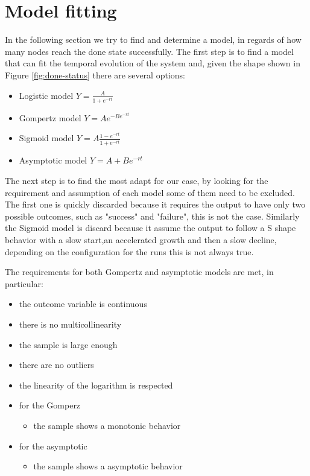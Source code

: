 \section{Model fitting} \label{sec:ModelFitting}
In the following section we try to find and determine a model, in regards of how many nodes reach the done state successfully. The first step is to find a model that can fit the temporal evolution of the system and, given the shape shown in Figure \ref{fig:done-status} there are several options:

\begin{itemize}
	\item Logistic model $ Y = \frac{A}{1 + e^{-rt}} $
	\item Gompertz model $ Y = Ae^{-Be^{-rt}} $
	\item Sigmoid model $ Y = A\frac{1-e^{-rt}}{1+e^{-rt}}$
	\item Asymptotic model $ Y = A + Be^{-rt}$
\end{itemize} 

The next step is to find the most adapt for our case, by looking for the requirement and assumption of each model some of them need to be excluded. The first one is quickly discarded because it requires the output to have only two possible outcomes, such as "success" and "failure", this is not the case.
Similarly the Sigmoid model is discard because it assume the output to follow a S shape behavior with a slow start,an accelerated growth and then a slow decline, depending on the configuration for the runs this is not always true.


The requirements for both Gompertz and asymptotic models are met, in particular:
\begin{itemize}
	\item the outcome variable is continuous
	\item there is no multicollinearity
	\item the sample is large enough
	\item there are no outliers
	\item the linearity of the logarithm is respected
	
	\item for the Gomperz
		\begin{itemize}
			\item the sample shows a monotonic behavior
		\end{itemize}
		\item for the asymptotic
		\begin{itemize}
			\item the sample shows a asymptotic behavior
		\end{itemize}
\end{itemize}

